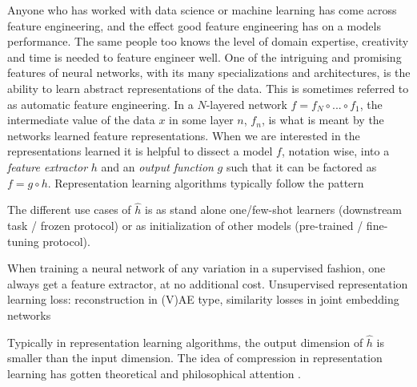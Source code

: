 \documentclass[../../thesis.tex]{subfiles}
\begin{document}
Anyone who has worked with data science or machine learning has come across feature engineering, and the effect good feature engineering has on a models performance. The same people too knows the level of domain expertise, creativity and time is needed to feature engineer well. One of the intriguing and promising features of neural networks, with its many specializations and architectures, is the ability to learn abstract representations of the data. This is sometimes referred to as automatic feature engineering.  In a $N$-layered network $f = f_N\circ ...\circ f_1$, the intermediate value of the data $x$ in some layer $n$, $f_n$, is what is meant by the networks learned feature representations. When we are interested in the representations learned it is helpful to dissect a model $f$, notation wise, into a \textit{feature extractor} $h$ and an \textit{output function}  $g$ such that it can be factored as $f = g \circ h$. \newline
Representation learning algorithms typically follow the pattern


The different use cases of $\widehat{h}$ is as stand alone one/few-shot learners (downstream task / frozen protocol) or as initialization of other models (pre-trained / fine-tuning protocol). \newline

When training a neural network of any variation in a supervised fashion, one always get a feature extractor, at no additional cost.  
Unsupervised representation learning loss: reconstruction in (V)AE type, similarity losses in joint embedding networks



Typically in representation learning algorithms, the output dimension of $\widehat{h}$ is smaller than the input dimension. The idea of compression in representation learning has gotten theoretical and philosophical attention . 
\end{document}
